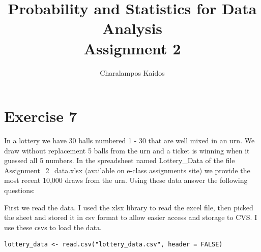 \documentclass{article}
\begin{document}
\title{Probability and Statistics for Data Analysis\\Assignment 2}
\author{Charalampos Kaidos}

\maketitle

\section*{Exercise 7}

In a lottery we have 30 balls numbered 1 - 30 that are well mixed in an urn. We
draw without replacement 5 balls from the urn and a ticket is winning when it
guessed all 5 numbers. In the spreadsheet named Lottery\_Data of the file
Assignment\_2\_data.xlsx (available on e-class assignments site) we provide the
most recent 10,000 draws from the urn.  Using these data answer the following
questions:

First we read the data. I used the xlsx library to read the excel file, then
picked the sheet and stored it in csv format to allow easier access and storage
to CVS. I use these csvs to load the data.

\begin{lstlisting}
lottery_data <- read.csv("lottery_data.csv", header = FALSE)
\end{lstlisting}
\end{document}
